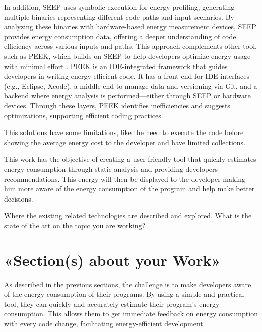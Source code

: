 \documentclass[sigplan]{acmart}
\begin{document}
In addition, SEEP \cite{10.1145/2094091.2094106} uses symbolic execution for energy profiling, generating multiple binaries representing different code paths and input scenarios. By analyzing these binaries with hardware-based energy measurement devices, SEEP provides energy consumption data, offering a deeper understanding of code efficiency across various inputs and paths. This approach complements other tool, such as PEEK, which builds on SEEP to help developers optimize energy usage with minimal effort \cite{187026}. PEEK is an IDE-integrated framework that guides developers in writing energy-efficient code. It has a front end for IDE interfaces (e.g., Eclipse, Xcode), a middle end to manage data and versioning via Git, and a backend where energy analysis is performed—either through SEEP or hardware devices. Through these layers, PEEK identifies inefficiencies and suggests optimizations, supporting efficient coding practices.


This solutions have some limitations, like the need to execute the code before showing the average energy cost to the developer and have limited collections.

This work has the objective of creating a user friendly tool that quickly estimates energy consumption through static analysis and providing developers recommendations. This energy will then be displayed to the developer making him more aware of the energy consumption of the program and help make better decisions.




% 

Where the existing related technologies are described and explored. What is the state of the art on the topic you are working? 



\section{«Section(s) about your Work»} \label{sec:work1}

As described in the previous sections, the challenge is to make developers aware of the energy consumption of their programs. By using a simple and practical tool, they can quickly and accurately estimate their program's energy consumption. This allows them to get immediate feedback on energy consumption with every code change, facilitating energy-efficient development.
\end{document}
